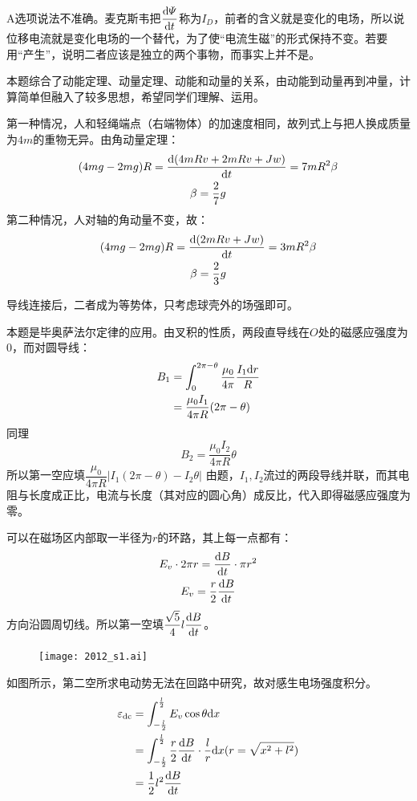 
\note A选项说法不准确。麦克斯韦把$\dfrac{\mathrm{d}\varPsi}{\mathrm{d}t}$称为$I_D$，前者的含义就是变化的电场，所以说位移电流就是变化电场的一个替代，为了使“电流生磁”的形式保持不变。若要用“产生”，说明二者应该是独立的两个事物，而事实上并不是。


\tips 本题综合了动能定理、动量定理、动能和动量的关系，由动能到动量再到冲量，计算简单但融入了较多思想，希望同学们理解、运用。


\solve 第一种情况，人和轻绳端点（右端物体）的加速度相同，故列式上与把人换成质量为$4m$的重物无异。由角动量定理：
\begin{gather*}
	(4mg-2mg)R=\dfrac{\mathrm{d}(4mRv+2mRv+Jw)}{\mathrm{d}t}=7mR^2\beta\\
	\beta=\dfrac{2}{7}g
\end{gather*}
第二种情况，人对轴的角动量不变，故：
\begin{gather*}
(4mg-2mg)R=\dfrac{\mathrm{d}(2mRv+Jw)}{\mathrm{d}t}=3mR^2\beta\\
\beta=\dfrac{2}{3}g
\end{gather*}


\tips 导线连接后，二者成为等势体，只考虑球壳外的场强即可。


\solve 本题是毕奥萨法尔定律的应用。由叉积的性质，两段直导线在$O$处的磁感应强度为0，而对圆导线：
\begin{align*}
	B_1&=\int_{0}^{2\pi-\theta}\dfrac{\mu_0}{4\pi}\dfrac{I_1\mathrm{d}r}{R}\\
	&=\dfrac{\mu_0I_1}{4\pi R}(2\pi-\theta)
\end{align*}
同理
\[
	B_2=\dfrac{\mu_0I_2}{4\pi R}\theta
\]
所以第一空应填$\dfrac{\mu_0}{4\pi R}|I_1(2\pi-\theta)-I_2\theta|$
由题，$I_1,I_2$流过的两段导线并联，而其电阻与长度成正比，电流与长度（其对应的圆心角）成反比，代入即得磁感应强度为零。


\solve 可以在磁场区内部取一半径为$r$的环路，其上每一点都有：
\begin{gather*}
	E_v\cdot 2\pi r=\dfrac{\mathrm{d}B}{\mathrm{d}t}\cdot \pi r^2\\
	E_v=\dfrac{r}{2}\dfrac{\mathrm{d}B}{\mathrm{d}t}
\end{gather*}
方向沿圆周切线。所以第一空填$\dfrac{\sqrt{5}}{4}l\dfrac{\mathrm{d}B}{\mathrm{d}t}$。

\begin{figure}
	\centering
	\texttt{[image: 2012\_s1.ai]}
\end{figure}
如图所示，第二空所求电动势无法在回路中研究，故对感生电场强度积分。
\begin{align*}
	\varepsilon_{\textrm{dc}}&=\int_{-\frac{l}{2}}^{\frac{l}{2}}E_v\cos\theta\mathrm{d}x\\
	&=\int_{-\frac{l}{2}}^{\frac{l}{2}}\dfrac{r}{2}\dfrac{\mathrm{d}B}{\mathrm{d}t}\cdot\dfrac{l}{r}\mathrm{d}x(r=\sqrt{x^2+l^2})\\
	&=\dfrac{1}{2}l^2\dfrac{\mathrm{d}B}{\mathrm{d}t}
\end{align*}

